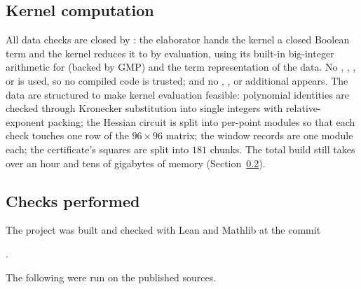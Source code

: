 \documentclass[11pt]{amsart}
\theoremstyle{definition}
\theoremstyle{remark}
\begin{document}
\subsection{Kernel computation}\label{sec:kernel}

All data checks are closed by : the elaborator hands the kernel a closed Boolean term and the kernel reduces it to  by evaluation, using its built-in big-integer arithmetic for  (backed by GMP) and the term representation of the data. No , , , or  is used, so no compiled code is trusted; and no , , or additional  appears. The data are structured to make kernel evaluation feasible: polynomial identities are checked through Kronecker substitution into single integers with relative-exponent packing; the Hessian circuit is split into per-point modules so that each check touches one row of the $96\times96$ matrix; the window records are one module each; the certificate's squares are split into $181$ chunks. The total build still takes over an hour and tens of gigabytes of memory (Section~\ref{sec:checks}).

\subsection{Checks performed}\label{sec:checks}

The project was built and checked with Lean  and Mathlib at the commit
\begin{center}.\end{center}
The following were run on the published sources.
\end{document}
